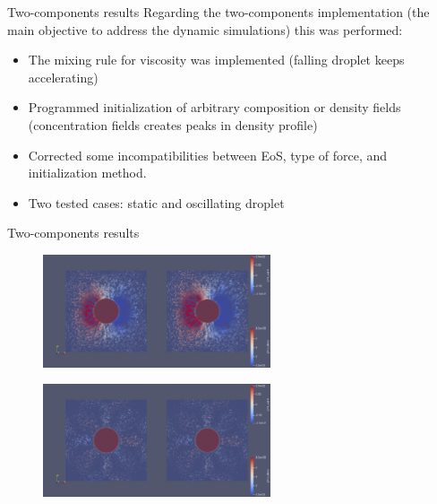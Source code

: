 \documentclass[8pt]{beamer}
\begin{document}
	
	\begin{frame}{Two-components results}
		Regarding the two-components implementation (the main objective to address the dynamic simulations) this was performed:
		
		\begin{itemize}
			\item The mixing rule for viscosity was implemented (falling droplet keeps accelerating)
			\item Programmed initialization of arbitrary composition or density fields (concentration fields creates peaks in density profile)
			\item Corrected some incompatibilities between EoS, type of force, and initialization method.
			\item Two tested cases: static and oscillating droplet
		\end{itemize}
	\end{frame}
	
	\begin{frame}{Two-components results}
		\begin{figure}
			\centering
			\includegraphics[width=0.60\textwidth]{pics/TwoCMP_MRT_StaticvsOsc.png}
		\end{figure}
	
		\begin{figure}
			\centering
			\includegraphics[width=0.6\textwidth]{pics/TwoCMP_MRT_StaticvsOscEq.png}
		\end{figure}
	\end{frame}
\end{document}
